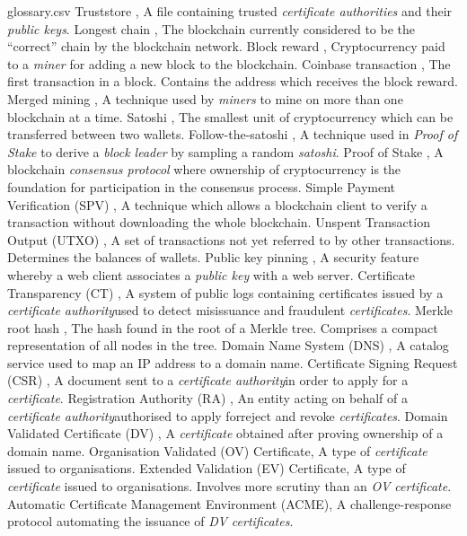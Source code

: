 \begin{filecontents*}{glossary.csv}
Truststore                        , A file containing trusted \emph{certificate authorities} and their \emph{public keys}.
Longest chain                     , The blockchain currently considered to be the ``correct'' chain by the blockchain network.
Block reward                      , Cryptocurrency paid to a \emph{miner} for adding a new block to the blockchain.
Coinbase transaction              , The first transaction in a block. Contains the address which receives the block reward.
Merged mining                     , A technique used by \emph{miners} to mine on more than one blockchain at a time.
Satoshi                           , The smallest unit of cryptocurrency which can be transferred between two wallets.
Follow-the-satoshi                , A technique used in \emph{Proof of Stake} to derive a \emph{block leader} by sampling a random \emph{satoshi}.
Proof of Stake                    , A blockchain \emph{consensus protocol} where ownership of cryptocurrency is the foundation for participation in the consensus process.
Simple Payment Verification (SPV) , A technique which allows a blockchain client to verify a transaction without downloading the whole blockchain.
Unspent Transaction Output (UTXO) , A set of transactions not yet referred to by other transactions. Determines the balances of wallets.
Public key pinning                , A security feature whereby a web client associates a \emph{public key} with a web server.
Certificate Transparency (CT)     , A system of public logs containing certificates issued by a \emph{certificate authority}\comma used to detect misissuance and fraudulent \emph{certificates}.
Merkle root hash                  , The hash found in the root of a Merkle tree. Comprises a compact representation of all nodes in the tree.
Domain Name System (DNS)          , A catalog service used to map an IP address to a domain name.
Certificate Signing Request (CSR) , A document sent to a \emph{certificate authority}\comma in order to apply for a \emph{certificate}.
Registration Authority (RA)       , An entity acting on behalf of a \emph{certificate authority}\comma authorised to apply for\comma reject and revoke \emph{certificates}.
Domain Validated Certificate (DV) , A \emph{certificate} obtained after proving ownership of a domain name.
Organisation Validated (OV) Certificate, A type of \emph{certificate} issued to organisations.
Extended Validation (EV) Certificate, A type of \emph{certificate} issued to organisations. Involves more scrutiny than an \emph{OV certificate}.
Automatic Certificate Management Environment (ACME), A challenge-response protocol automating the issuance of \emph{DV certificates}.

\end{filecontents*}

